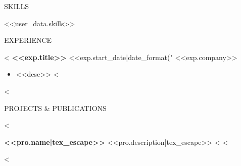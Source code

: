 \documentclass{faangpath_simple_template_resume} %
\begin{document}


\begin{rSection}{SKILLS}

<<user_data.skills>>

\end{rSection}


\begin{rSection}{EXPERIENCE}

<%
\textbf{<<exp.title>>} \hfill <<exp.start_date|date_format("%
<<exp.company>>
 \begin{itemize}
     <%
     \item <<desc>>
     <%
 \end{itemize}
<%

\end{rSection}


\begin{rSection}{PROJECTS \& PUBLICATIONS}

\vspace{-1.25em}

<%
\item \textbf{<<pro.name|tex_escape>>} {<<pro.description|tex_escape>>}
<%
    \href{<<pro.link|tex_escape>>}{}
<%


<%

\end{rSection}
\end{document}
